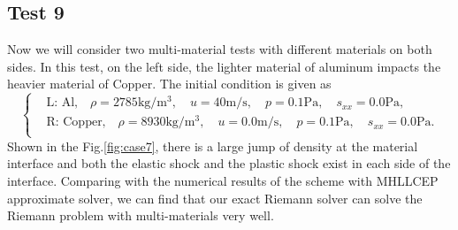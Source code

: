 \documentclass[review]{elsarticle}
\numberwithin{equation}{section}
\numberwithin{table}{section}
\begin{document}
\subsection{Test 9}
Now we will consider two multi-material tests with different materials on both sides. In this test, on the left side, the lighter material of aluminum impacts the heavier material of Copper. The initial condition is given as
\begin{equation}
 \left\{ \begin{aligned}
	 &	 \text{L: Al,}\quad  \rho = 2785 \text{kg}/\text{m}^3, \quad  u = 40\text{m}/\text{s}, \quad  p = 0.1\text{Pa}, \quad  s_{xx}=0.0\text{Pa},\\
	 &	 \text{R: Copper,}\quad  \rho = 8930\text{kg}/\text{m}^3, \quad  u = 0.0\text{m}/\text{s}, \quad  p =0.1\text{Pa}, \quad  s_{xx}=0.0\text{Pa}.\\
   \end{aligned}
 \right.
\end{equation}
Shown in the Fig.\ref{fig:case7}, there is a large jump of density at the material interface and  both the  elastic shock and the plastic shock exist in each side of the interface. Comparing with the numerical results of the scheme with MHLLCEP approximate solver, we can find that our exact Riemann solver can solve the Riemann problem with multi-materials very well.
\end{document}
